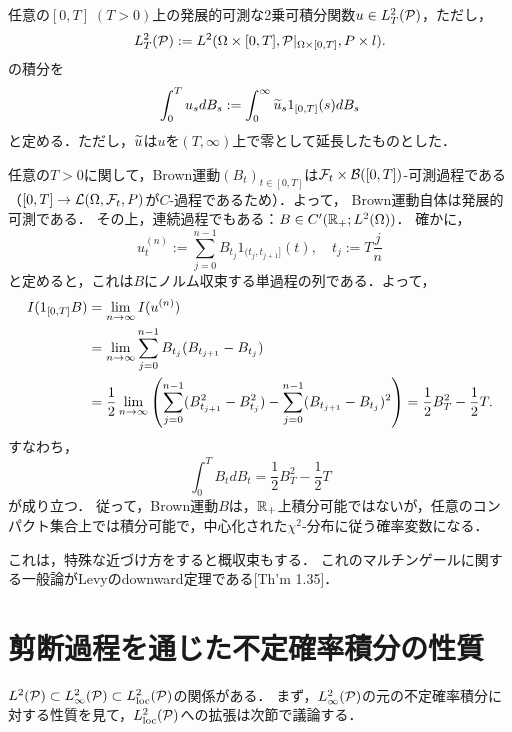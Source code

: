 \documentclass[uplatex,dvipdfmx]{jsreport}
\begin{document}
\begin{definition}[有限区間上の不定積分]
    任意の$[0,T]\;(T>0)$上の発展的可測な2乗可積分関数$u\in L^2_T(\P)$，ただし，
    \[L^2_T(\P):=L^2(\Om\times[0,T],\P|_{\Om\times[0,T]},P\times l).\]
    の積分を
    \[\int^T_0u_sdB_s:=\int^\infty_0\wt{u}_s1_{[0,T]}(s)dB_s\]
    と定める．ただし，$\wt{u}$は$u$を$(T,\infty)$上で零として延長したものとした．
\end{definition}

\begin{example}[Brown運動の不定積分]\label{exp-integral-of-Brownian-motion}
    任意の$T>0$に関して，Brown運動$(B_t)_{t\in[0,T]}$は$\F_t\times\B([0,T])$-可測過程である（$[0,T]\to\L(\Om,\F_t,P)$が$C$-過程であるため）．よって，
    Brown運動自体は発展的可測である．
    その上，連続過程でもある：$B\in C'(\R_+;L^2(\Om))$．
    確かに，
    \[u^{(n)}_t:=\sum^{n-1}_{j=0}B_{t_j}1_{(t_j,t_{j+1}]}(t),\quad t_j:=T\frac{j}{n}\]
    と定めると，これは$B$にノルム収束する単過程の列である．よって，
    \begin{align*}
        I(1_{[0,T]}B)&=\lim_{n\to\infty}I(u^{(n)})\\
        &=\lim_{n\to\infty}\sum^{n-1}_{j=0}B_{t_j}(B_{t_{j+1}}-B_{t_j})\\
        &=\frac{1}{2}\lim_{n\to\infty}\paren{\sum^{n-1}_{j=0}(B_{t_{j+1}}^2-B^2_{t_j})-\sum^{n-1}_{j=0}(B_{t_{j+1}}-B_{t_j})^2}=\frac{1}{2}B_T^2-\frac{1}{2}T.
    \end{align*}
    すなわち，
    \[\int^T_0B_tdB_t=\frac{1}{2}B^2_T-\frac{1}{2}T\]
    が成り立つ．
    従って，Brown運動$B$は，$\R_+$上積分可能ではないが，任意のコンパクト集合上では積分可能で，中心化された$\chi^2$-分布に従う確率変数になる．
\end{example}
\begin{remarks}
    これは，特殊な近づけ方をすると概収束もする．
    これのマルチンゲールに関する一般論がLevyのdownward定理である\cite{Morters and Peres}[Th'm 1.35]．
\end{remarks}

\section{剪断過程を通じた不定確率積分の性質}

\begin{tcolorbox}[colframe=ForestGreen, colback=ForestGreen!10!white,breakable,colbacktitle=ForestGreen!40!white,coltitle=black,fonttitle=\bfseries\sffamily,
title=]
    $L^2(\P)\subset L^2_\infty(\P)\subset L^2_\loc(\P)$の関係がある．
    まず，$L^2_\infty(\P)$の元の不定確率積分に対する性質を見て，$L^2_\loc(\P)$への拡張は次節で議論する．
\end{tcolorbox}
\end{document}

